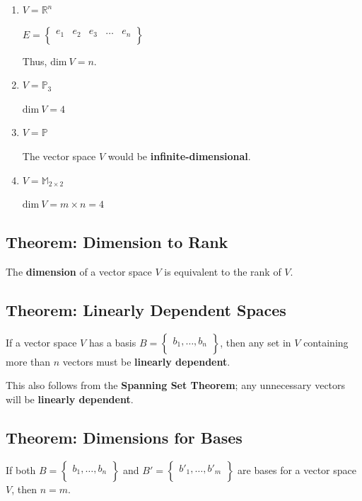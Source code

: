 \documentclass[12pt, letterpaper]{article}
\begin{document}
\begin{enumerate}
  \item $ V = \mathbb{R}^n $
    \bigskip

    $ E =
    \begin{Bmatrix}
      e_1 & e_2 & e_3 & \hdots & e_n \\
    \end{Bmatrix} $
    \bigskip

    Thus, $ \textrm{dim} \: V = n $.
  \item $ V = \mathbb{P}_3 $
    \bigskip

    $ \textrm{dim} \: V = 4 $
  \item $ V = \mathbb{P} $
    \bigskip

    The vector space $ V $ would be \textbf{infinite-dimensional}.
  \item $ V = \mathbb{M}_{2 \times 2} $
    \bigskip

    $ \textrm{dim} \: V = m \times n = 4 $
\end{enumerate}

\subsection*{Theorem: Dimension to Rank}

The \textbf{dimension} of a vector space $ V $ is equivalent to the
rank of $ V $.

\subsection*{Theorem: Linearly Dependent Spaces}

If a vector space $ V $ has a basis $ B =
\begin{Bmatrix}
  b_1, \hdots, b_n \\
\end{Bmatrix} $, then any set in $ V $ containing more than $ n $
vectors must be \textbf{linearly dependent}.
\medskip

This also follows from the \textbf{Spanning Set Theorem}; any
unnecessary vectors will be \textbf{linearly dependent}.

\subsection*{Theorem: Dimensions for Bases}

If both $ B =
\begin{Bmatrix}
  b_1, \hdots, b_n \\
\end{Bmatrix} $ and
$ B' =
\begin{Bmatrix}
  b'_1, \hdots, b'_m \\
\end{Bmatrix} $ are bases for a vector space $ V $, then $ n = m $.
\end{document}
